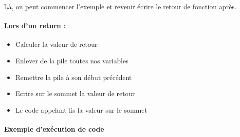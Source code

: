 \begin{com}
	Là, on peut commencer l'exemple et revenir écrire le retour de fonction après.
\end{com}

\paragraph{Lors d'un return :}
\begin{itemize}[label=$\star$]
	\item Calculer la valeur de retour
	\item Enlever de la pile toutes nos variables
	\item Remettre la pile à son début précédent
	\item Ecrire sur le sommet la valeur de retour
	\item Le code appelant lis la valeur sur le sommet
\end{itemize}

\paragraph{Exemple d'exécution de code} \enspace \\

